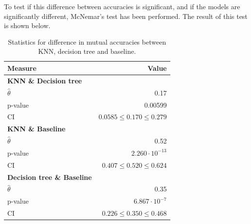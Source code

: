 \documentclass[11pt, fleqn, titlepage]{article}
\begin{document}
\noindent To test if this difference between accuracies is significant, and if the models are significantly different, McNemar's test has been performed. The result of this test is shown below.


\begin{table}[H]
	\centering
	\begin{tabular}{l r}
		\toprule
		Measure        & Value                          \\ \midrule

		\textbf{KNN \& Decision tree} &                 \\		
		$\hat{\theta}$ & 0.17                           \\ 
		p-value        & 0.00599                        \\ 
		CI             & $0.0585 \leq 0.170 \leq 0.279$ \\ \midrule

		\textbf{KNN \& Baseline} &                      \\		
		$\hat{\theta}$ & 0.52                           \\ 
		p-value        & $2.260 \cdot 10^{-13}$      \\ 
		CI             & $0.407 \leq 0.520 \leq 0.624$ \\ \midrule
		
		\textbf{Decision tree \& Baseline} &            \\
		$\hat{\theta}$ & 0.35                           \\ 
		p-value        & $6.867 \cdot 10^{-7}$       \\ 
		CI             & $0.226 \leq 0.350 \leq 0.468$ \\ \bottomrule
		
	\end{tabular}
\caption{Statistics for difference in mutual accuracies between KNN, decision tree and baseline.}
\label{measuresKNNDT}
\end{table}
\end{document}
